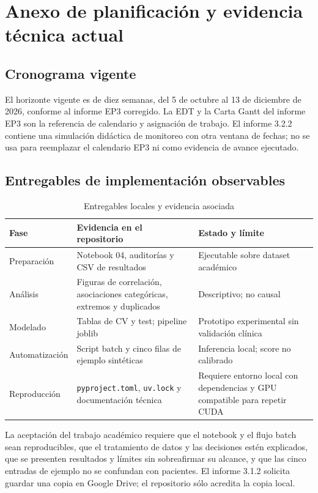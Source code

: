 \section{Anexo de planificación y evidencia técnica actual}

\subsection{Cronograma vigente}

El horizonte vigente es de diez semanas, del 5 de octubre al 13 de diciembre de 2026, conforme al informe EP3 corregido. La EDT y la Carta Gantt del informe EP3 son la referencia de calendario y asignación de trabajo. El informe 3.2.2 contiene una simulación didáctica de monitoreo con otra ventana de fechas; no se usa para reemplazar el calendario EP3 ni como evidencia de avance ejecutado.

\subsection{Entregables de implementación observables}

\begin{table}[H]
  \centering
  \caption{Entregables locales y evidencia asociada}
  \label{tab:entregables-implementacion-actual}
  \small
  \begin{tabularx}{\textwidth}{@{}p{3cm}X X@{}}
    \toprule
    Fase & Evidencia en el repositorio & Estado y límite \\
    \midrule
    Preparación & Notebook 04, auditorías y CSV de resultados & Ejecutable sobre dataset académico \\
    Análisis & Figuras de correlación, asociaciones categóricas, extremos y duplicados & Descriptivo; no causal \\
    Modelado & Tablas de CV y test; pipeline joblib & Prototipo experimental sin validación clínica \\
    Automatización & Script batch y cinco filas de ejemplo sintéticas & Inferencia local; score no calibrado \\
    Reproducción & \texttt{pyproject.toml}, \texttt{uv.lock} y documentación técnica & Requiere entorno local con dependencias y GPU compatible para repetir CUDA \\
    \bottomrule
  \end{tabularx}
\end{table}

La aceptación del trabajo académico requiere que el notebook y el flujo batch sean reproducibles, que el tratamiento de datos y las decisiones estén explicados, que se presenten resultados y límites sin sobreafirmar su alcance, y que las cinco entradas de ejemplo no se confundan con pacientes. El informe 3.1.2 solicita guardar una copia en Google Drive; el repositorio sólo acredita la copia local.

